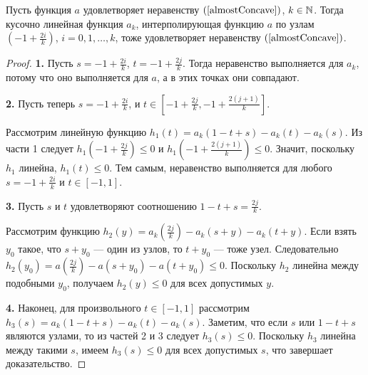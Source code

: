 \begin{lm}
\label{piecewiseLinearConcave}
Пусть функция $a$ удовлетворяет неравенству $(\ref{almostConcave})$, $k \in \mathbb N$.
Тогда кусочно линейная функция $a_k$, интерполирующая функцию $a$ по узлам
$(-1 + \frac{2i}{k})$, $i = 0, 1, \dots, k$, тоже удовлетворяет неравенству $(\ref{almostConcave})$.
\end{lm}
\begin{proof}
\textbf{1.}
Пусть $s = -1 + \frac{2i}{k}$, $t = -1 + \frac{2j}{k}$.
Тогда неравенство выполняется для $a_k$, потому что оно выполняется для $a$,
а в этих точках они совпадают.

\textbf{2.}
Пусть теперь $s = -1 + \frac{2i}{k}$, и $t \in [-1 + \frac{2j}{k}, -1 + \frac{2(j + 1)}{k}]$.

Рассмотрим линейную функцию $h_1(t) = a_k( 1 - t + s ) - a_k(t) - a_k(s)$.
Из части 1 следует $h_1(-1 + \frac{2j}{k}) \le 0$ и $h_1(-1 + \frac{2(j + 1)}{k}) \le 0$.
Значит, поскольку $h_1$ линейна, $h_1(t) \le 0$.
Тем самым, неравенство выполняется для любого $s = -1 + \frac{2i}{k}$ и $t \in [-1, 1]$.

\textbf{3.}
Пусть $s$ и $t$ удовлетворяют соотношению $1 - t + s = \frac{2j}{k}$.

Рассмотрим функцию $h_2(y) = a_k(\frac{2j}{k}) - a_k(s + y) - a_k(t + y)$.
Если взять $y_0$ такое, что $s + y_0$ --- один из узлов, то $t + y_0$ --- тоже узел.
Следовательно $h_2(y_0) = a(\frac{2j}{k}) - a(s + y_0) - a(t + y_0) \le 0$.
Поскольку $h_2$ линейна между подобными $y_0$, получаем $h_2(y) \le 0$ для всех допустимых $y$.

\textbf{4.}
Наконец, для произвольного $t \in [-1, 1]$ рассмотрим $h_3(s) = a_k( 1 - t + s ) - a_k(t) - a_k(s)$.
Заметим, что если $s$ или $1 - t + s$ являются узлами, то из частей 2 и 3 следует $h_3(s) \le 0$.
Поскольку $h_3$ линейна между такими $s$, имеем $h_3(s) \le 0$ для всех допустимых $s$, что завершает доказательство.
\end{proof}
